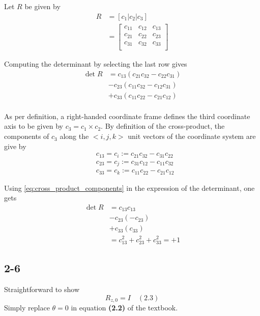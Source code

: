 Let $R$ be given by
\begin{align*}
R &= [ c_1 | c_2 | c_3 ] \\
& = \left[\begin{array}{ccc} 
c_{11} & c_{12} & c_{13} \\  
c_{21} & c_{22} & c_{23} \\  
c_{31} & c_{32} & c_{33} \\   
\end{array}\right]
\end{align*}

Computing the determinant by selecting the last row gives
\begin{align*}
\det R &= c_{13} (c_{21}c_{32}-c_{22}c_{31}) \\
 & - c_{23} (c_{11}c_{32}-c_{12}c_{31}) \\
 & + c_{33} (c_{11}c_{22}-c_{21}c_{12}) \\
\end{align*}

As per definition, a right-handed coordinate frame defines the third coordinate axis to be given by $c_3 = c_1 \times c_2$. By definition of the cross-product, the components of $c_3$ along the $<i,j,k>$ unit vectors of the coordinate system are give by 
\begin{align}
&c_{13} = c_i := c_{21} c_{32} - c_{31} c_{22} \nonumber \\
&c_{23} = c_j := c_{31}c_{12} - c_{11}c_{32} \label{eq:cross_product_components} \\
&c_{33} = c_k := c_{11}c_{22} - c_{21}c_{12} \nonumber
\end{align} 

Using \eqref{eq:cross_product_components} in the expression of the determinant, one gets 
\begin{align*}
\det R &= c_{13}  c_{13} \\
& - c_{23} (-c_{23}) \\
& + c_{33} (c_{33}) \\
& = c_{13}^2 +c_{23}^2 + c_{33}^2  = +1
\end{align*}

\subsection*{2-6}

Straightforward to show
\begin{equation*}
R_{z,0} = I \quad (2.3)
\end{equation*} 
Simply replace $\theta = 0$ in equation \textbf{(2.2)} of the textbook.

